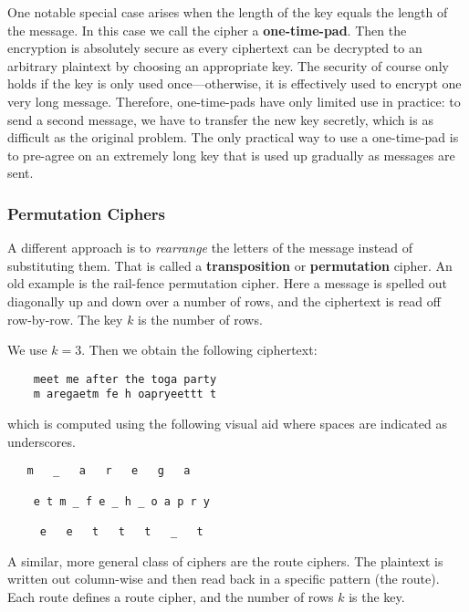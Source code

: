 One notable special case arises when the length of the key equals the length of the message.
In this case we call the cipher a \textbf{one-time-pad}.
Then the encryption is absolutely secure as every ciphertext can be decrypted to an arbitrary plaintext by choosing an appropriate key.
The security of course only holds if the key is only used once---otherwise, it is effectively used to encrypt one very long message.
Therefore, one-time-pads have only limited use in practice: to send a second message, we have to transfer the new key secretly, which is as difficult as the original problem.
The only practical way to use a one-time-pad is to pre-agree on an extremely long key that is used up gradually as messages are sent.

\subsubsection{Permutation Ciphers}

A different approach is to \emph{rearrange} the letters of the message instead of substituting them.
That is called a \textbf{transposition} or \textbf{permutation} cipher.
An old example is the rail-fence permutation cipher.
Here a message is spelled out diagonally up and down over a number of rows, and the ciphertext is read off row-by-row.
The key $k$ is the number of rows.

\begin{example}
\footnotemark
 We use $k=3$.
 Then we obtain the following ciphertext:
  \begin{lstlisting}
    meet me after the toga party
    m aregaetm fe h oapryeettt t
  \end{lstlisting}
which is computed using the following visual aid where spaces are indicated as underscores.
  \begin{lstlisting}
   m   _   a   r   e   g   a

    e t m _ f e _ h _ o a p r y

     e   e   t   t   t   _   t
  \end{lstlisting}
\end{example}

A similar, more general class of ciphers are the route ciphers.
The plaintext is written out column-wise and then read back in a specific pattern (the route).
Each route defines a route cipher, and the number of rows $k$ is the key.

